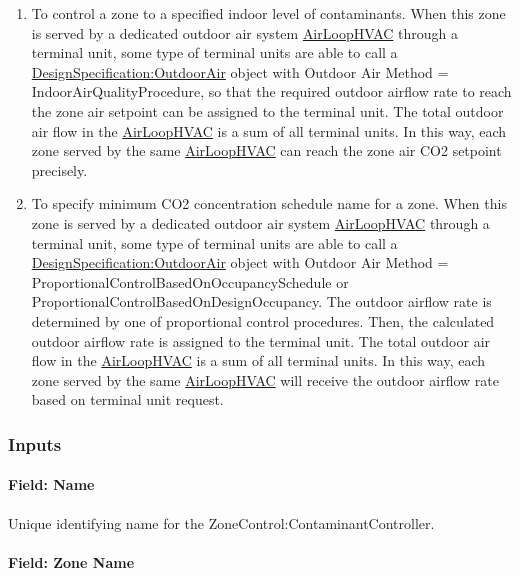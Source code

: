 \begin{enumerate}
\def\labelenumi{\arabic{enumi})}
\item
  To control a zone to a specified indoor level of contaminants. When this zone is served by a dedicated outdoor air system \hyperref[airloophvac]{AirLoopHVAC} through a terminal unit, some type of terminal units are able to call a \hyperref[designspecificationoutdoorair]{DesignSpecification:OutdoorAir} object with Outdoor Air Method = IndoorAirQualityProcedure, so that the required outdoor airflow rate to reach the zone air setpoint can be assigned to the terminal unit. The total outdoor air flow in the \hyperref[airloophvac]{AirLoopHVAC} is a sum of all terminal units. In this way, each zone served by the same \hyperref[airloophvac]{AirLoopHVAC} can reach the zone air CO2 setpoint precisely.
\item
  To specify minimum CO2 concentration schedule name for a zone. When this zone is served by a dedicated outdoor air system \hyperref[airloophvac]{AirLoopHVAC} through a terminal unit, some type of terminal units are able to call a \hyperref[designspecificationoutdoorair]{DesignSpecification:OutdoorAir} object with Outdoor Air Method = ProportionalControlBasedOnOccupancySchedule or ProportionalControlBasedOnDesignOccupancy. The outdoor airflow rate is determined by one of proportional control procedures. Then, the calculated outdoor airflow rate is assigned to the terminal unit. The total outdoor air flow in the \hyperref[airloophvac]{AirLoopHVAC} is a sum of all terminal units. In this way, each zone served by the same \hyperref[airloophvac]{AirLoopHVAC} will receive the outdoor airflow rate based on terminal unit request.

\end{enumerate}

\subsubsection{Inputs}\label{inputs-14-017}

\paragraph{Field: Name}\label{field-name-12-013}

Unique identifying name for the ZoneControl:ContaminantController.

\paragraph{Field: Zone Name}\label{field-controlled-zone-name-000}

